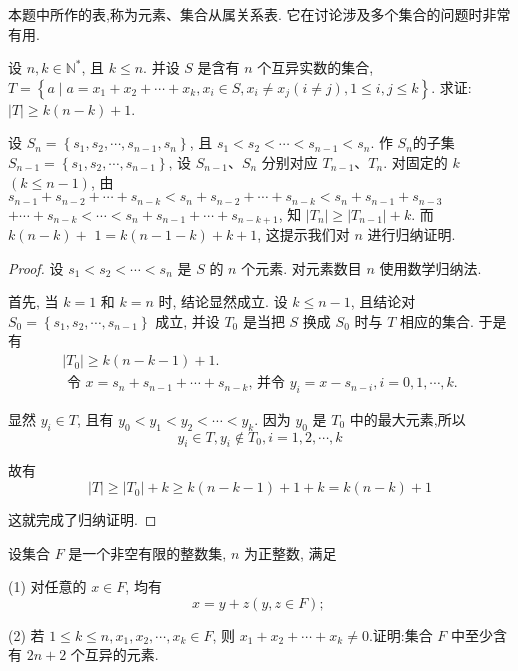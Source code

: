 \begin{note}
	本题中所作的表,称为元素、集合从属关系表. 它在讨论涉及多个集合的问题时非常有用.
\end{note}

\begin{example}
	设 $n, k \in \mathbb{N}^{*}$, 且 $k \leqslant n$. 并设 $S$ 是含有 $n$ 个互异实数的集合, $T=\left\{a \mid a=x_{1}+x_{2}+\cdots+x_{k}, x_{i} \in S, x_{i} \neq x_{j}(i \neq j), 1 \leqslant i, j \leqslant k\right\}$. 求证: $|T| \geqslant k(n-k)+1$.
\end{example}

\begin{analysis}
	设 $S_{n}=\left\{s_{1}, s_{2}, \cdots, s_{n-1}, s_{n}\right\}$, 且 $s_{1}<s_{2}<\cdots<s_{n-1}<s_{n}$. 作 $S_{n}$的子集 $S_{n-1}=\left\{s_{1}, s_{2}, \cdots, s_{n-1}\right\}$, 设 $S_{n-1} 、 S_{n}$ 分别对应 $T_{n-1} 、 T_{n}$. 对固定的 $k$ $(k \leqslant n-1)$, 由 $s_{n-1}+s_{n-2}+\cdots+s_{n-k}<s_{n}+s_{n-2}+\cdots+s_{n-k}<s_{n}+s_{n-1}+s_{n-3}$ $+\cdots+s_{n-k}<\cdots<s_{n}+s_{n-1}+\cdots+s_{n-k+1}$, 知 $\left|T_{n}\right| \geqslant\left|T_{n-1}\right|+k$. 而 $k(n-k)+$ $1=k(n-1-k)+k+1$, 这提示我们对 $n$ 进行归纳证明.
\end{analysis}

\begin{proof}
	设 $s_{1}<s_{2}<\cdots<s_{n}$ 是 $S$ 的 $n$ 个元素. 对元素数目 $n$ 使用数学归纳法.

	首先, 当 $k=1$ 和 $k=n$ 时, 结论显然成立. 设 $k \leqslant n-1$, 且结论对 $S_{0}=\left\{s_{1}, s_{2}, \cdots, s_{n-1}\right\}$ 成立, 并设 $T_{0}$ 是当把 $S$ 换成 $S_{0}$ 时与 $T$ 相应的集合. 于是有
	$$
		\begin{gathered}
			\left|T_{0}\right| \geqslant k(n-k-1)+1 . \\
			\text { 令 } x=s_{n}+s_{n-1}+\cdots+s_{n-k} \text {, 并令 } y_{i}=x-s_{n-i}, i=0,1, \cdots, k .
		\end{gathered}
	$$

	显然 $y_{i} \in T$, 且有 $y_{0}<y_{1}<y_{2}<\cdots<y_{k}$. 因为 $y_{0}$ 是 $T_{0}$ 中的最大元素,所以
	$$
		y_{i} \in T, y_{i} \notin T_{0}, i=1,2, \cdots, k
	$$

	故有
	$$
		|T| \geqslant\left|T_{0}\right|+k \geqslant k(n-k-1)+1+k=k(n-k)+1
	$$

	这就完成了归纳证明.
\end{proof}

\begin{example}
	设集合 $F$ 是一个非空有限的整数集, $n$ 为正整数, 满足

	(1) 对任意的 $x \in F$, 均有
	$$
		x=y+z(y, z \in F) \text {; }
	$$

	(2) 若 $1 \leqslant k \leqslant n, x_{1}, x_{2}, \cdots, x_{k} \in F$, 则 $x_{1}+x_{2}+\cdots+x_{k} \neq 0$.证明:集合 $F$ 中至少含有 $2 n+2$ 个互异的元素.
\end{example}

